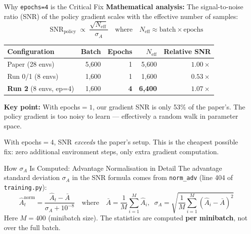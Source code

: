 \documentclass[aspectratio=169,11pt]{beamer}
\begin{document}
\begin{frame}{Why \texttt{epochs=4} is the Critical Fix}
  \small
  \textbf{Mathematical analysis:} The signal-to-noise ratio (SNR) of the policy gradient
  scales with the effective number of samples:
  \[
    \text{SNR}_\text{policy} \;\propto\; \frac{\sqrt{N_\text{eff}}}{\sigma_A}
    \quad\text{where}\quad
    N_\text{eff} \approx \text{batch} \times \text{epochs}
  \]

  \begin{center}
  \begin{tabular}{lrrrr}
    \toprule
    \textbf{Configuration} & \textbf{Batch} & \textbf{Epochs} & $N_\text{eff}$ & \textbf{Relative SNR} \\
    \midrule
    Paper (28 envs)  & 5{,}600 & 1 & 5{,}600 & $1.00\times$ \\
    Run 0/1 (8 envs) & 1{,}600 & 1 & 1{,}600 & $0.53\times$ \\
    \rowcolor{highlight}
    \textbf{Run 2} (8 envs, ep=4) & 1{,}600 & \textbf{4} & \textbf{6{,}400} & $\mathbf{1.07\times}$ \\
    \bottomrule
  \end{tabular}
  \end{center}

  \medskip
  \textbf{Key point:} With epochs${}=1$, our gradient SNR is only 53\% of the paper's.
  The policy gradient is too noisy to learn --- effectively a random walk in parameter space.

  \medskip
  With epochs${}=4$, SNR \emph{exceeds} the paper's setup.  This is the cheapest possible
  fix: zero additional environment steps, only extra gradient computation.
\end{frame}

\begin{frame}{How $\sigma_A$ Is Computed: Advantage Normalisation in Detail}
  \small
  The advantage standard deviation $\sigma_A$ in the SNR formula comes from
  \texttt{norm\_adv} (line 404 of \texttt{training.py}):
  \[
    \hat{A}_t^\text{norm} = \frac{\hat{A}_t - \bar{A}}{\sigma_A + 10^{-8}}
    \quad\text{where}\quad
    \bar{A} = \frac{1}{M}\sum_{i=1}^M \hat{A}_i, \;\;
    \sigma_A = \sqrt{\frac{1}{M}\sum_{i=1}^M (\hat{A}_i - \bar{A})^2}
  \]
  Here $M = 400$ (minibatch size). The statistics are computed \textbf{per minibatch},
  not over the full batch.
\end{frame}
\end{document}
